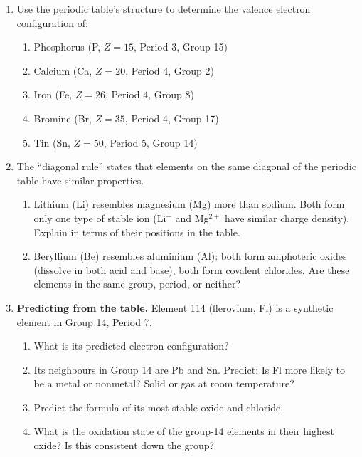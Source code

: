 \documentclass[12pt, a4paper]{book}
\begin{document}
\begin{problembox}
\begin{enumerate}[label=\textbf{\arabic*.}]
  \item Use the periodic table's structure to determine
        the valence electron configuration of:
        \begin{enumerate}[label=(\alph*)]
          \item Phosphorus (P, $Z=15$, Period 3, Group 15)
          \item Calcium (Ca, $Z=20$, Period 4, Group 2)
          \item Iron (Fe, $Z=26$, Period 4, Group 8)
          \item Bromine (Br, $Z=35$, Period 4, Group 17)
          \item Tin (Sn, $Z=50$, Period 5, Group 14)
        \end{enumerate}

  \item The ``diagonal rule'' states that elements on the
        same diagonal of the periodic table have similar
        properties.
        \begin{enumerate}[label=(\alph*)]
          \item Lithium (Li) resembles magnesium (Mg) more
                than sodium.
                Both form only one type of stable ion
                (Li$^+$ and Mg$^{2+}$ have similar charge
                density).
                Explain in terms of their positions in the table.
          \item Beryllium (Be) resembles aluminium (Al):
                both form amphoteric oxides (dissolve in both
                acid and base), both form covalent chlorides.
                Are these elements in the same group, period,
                or neither?
        \end{enumerate}

  \item \textbf{Predicting from the table.}
        Element 114 (flerovium, Fl) is a synthetic element
        in Group 14, Period 7.
        \begin{enumerate}[label=(\alph*)]
          \item What is its predicted electron configuration?
          \item Its neighbours in Group 14 are Pb and Sn.
                Predict: Is Fl more likely to be a metal or
                nonmetal? Solid or gas at room temperature?
          \item Predict the formula of its most stable oxide
                and chloride.
          \item What is the oxidation state of the group-14
                elements in their highest oxide?
                Is this consistent down the group?
        \end{enumerate}
\end{enumerate}
\end{problembox}
\end{document}
